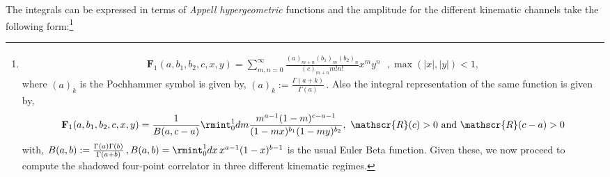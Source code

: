 \noindent
The integrals can be expressed in terms of \textit{Appell hypergeometric} functions and the amplitude for the different kinematic channels take the following form:\footnote{ 
\begin{align}
\mathbf{F}_1(a,b_1,b_2,c,x,y)=\sum_{m,n=0}^\infty \frac{(a)_{m+n}(b_1)_m(b_2)_n}{(c)_{m+n}m!n!}x^m y^n \,\,\,\,,\max(|x|,|y|)<1,\nonumber
\end{align}
\noindent
where $(a)_k$ is the Pochhammer symbol is given by,
$
    (a)_k:=\frac{\Gamma(a+k)}{\Gamma(a)}\,.$
Also the integral representation of the same function is given by,
\begin{align}
  \mathbf{F}_1(a,b_1,b_2,c,x,y)=\frac{1}{B(a,c-a)}\rmint_0^1 dm \frac{m^{a-1}(1-m)^{c-a-1}  }{(1-mx)^{b_1}(1-my)^{b_2}}
,\,\,\mathscr{R}(c)>0 \mbox{ and } \mathscr{R}(c-a)>0\nonumber
\end{align}
with,
$B(a,b):=\frac{\Gamma(a)\Gamma(b)}{\Gamma(a+b)}\,, B(a,b)=\rmint_0^1 dx \,x^{a-1}(1-x)^{b-1} $
is the usual Euler Beta function. Given these, we now proceed to compute the shadowed four-point correlator in three different kinematic regimes.}


